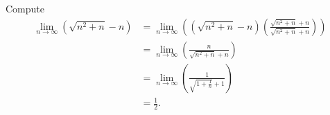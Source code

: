 \begin{Exercise}
\begin{solution}
Compute
\begin{align*}
\lim_{n\to\infty} \left( \sqrt{n^2+n}-n \right)
&= \lim_{n\to\infty} \left( \left( \sqrt{n^2+n}-n \right) \left( \frac{\sqrt{n^2+n}+n}{\sqrt{n^2+n}+n} \right) \right) \\
&= \lim_{n\to\infty} \left( \frac{n}{\sqrt{n^2+n}+n} \right) \\
&= \lim_{n\to\infty} \left( \frac{1}{\sqrt{1+\frac{1}{n}}+1} \right) \\
&= \frac{1}{2}.
\end{align*}
\end{solution}
\end{Exercise}